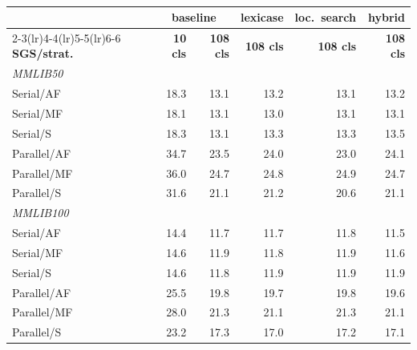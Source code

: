 \begin{table}[htbp]
  \centering
  \small
  \caption[Full 108-class re-evaluation, renewable conditions]{}
  \label{tab:full108-renewable}
  \begin{tabular}{lrrrrr}
    \toprule
    & \multicolumn{2}{c}{\textbf{baseline}} & \textbf{lexicase}
    & \textbf{loc.\ search} & \textbf{hybrid} \\
    \cmidrule(lr){2-3}\cmidrule(lr){4-4}\cmidrule(lr){5-5}\cmidrule(lr){6-6}
    \textbf{SGS/strat.} & \textbf{10 cls} & \textbf{108 cls}
    & \textbf{108 cls} & \textbf{108 cls} & \textbf{108 cls} \\
    \midrule
    \multicolumn{6}{l}{\textit{MMLIB50}} \\
    Serial/AF   & 18.3 & 13.1 & 13.2 & 13.1 & 13.2 \\
    Serial/MF   & 18.1 & 13.1 & 13.0 & 13.1 & 13.1 \\
    Serial/S    & 18.3 & 13.1 & 13.3 & 13.3 & 13.5 \\
    Parallel/AF & 34.7 & 23.5 & 24.0 & 23.0 & 24.1 \\
    Parallel/MF & 36.0 & 24.7 & 24.8 & 24.9 & 24.7 \\
    Parallel/S  & 31.6 & 21.1 & 21.2 & 20.6 & 21.1 \\
    \midrule
    \multicolumn{6}{l}{\textit{MMLIB100}} \\
    Serial/AF   & 14.4 & 11.7 & 11.7 & 11.8 & 11.5 \\
    Serial/MF   & 14.6 & 11.9 & 11.8 & 11.9 & 11.6 \\
    Serial/S    & 14.6 & 11.8 & 11.9 & 11.9 & 11.9 \\
    Parallel/AF & 25.5 & 19.8 & 19.7 & 19.8 & 19.6 \\
    Parallel/MF & 28.0 & 21.3 & 21.1 & 21.3 & 21.1 \\
    Parallel/S  & 23.2 & 17.3 & 17.0 & 17.2 & 17.1 \\
    \bottomrule
  \end{tabular}
\end{table}

